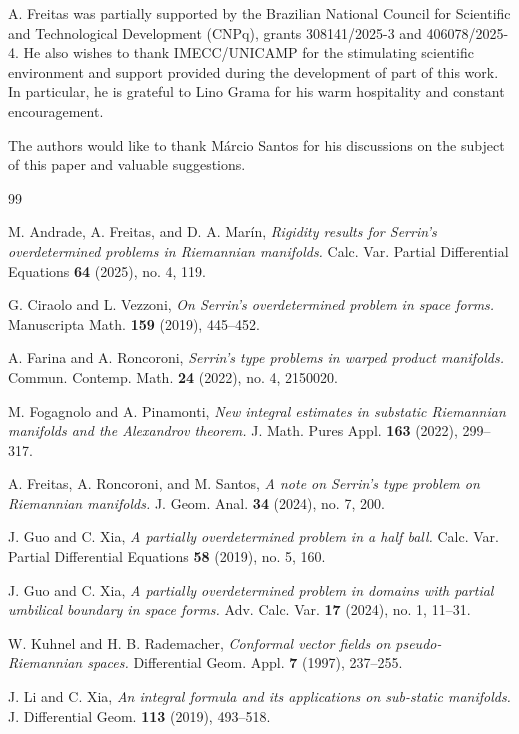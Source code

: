 \documentclass[reqno,11pt]{amsart}
\numberwithin{equation}{section}  %
\begin{document}
A. Freitas was partially supported by the Brazilian National Council for Scientific and Technological Development (CNPq), grants 308141/2025-3 and 406078/2025-4. He also wishes to thank IMECC/UNICAMP for the stimulating scientific environment and support provided during the development of part of this work. In particular, he is grateful to Lino Grama for his warm hospitality and constant encouragement.

The authors would like to thank Márcio Santos for his discussions on the subject of this paper and valuable suggestions.
%
%
\begin{thebibliography}{99}

M. Andrade, A. Freitas, and D. A. Mar\'in,
\emph{Rigidity results for Serrin's overdetermined problems in Riemannian manifolds.}
Calc. Var. Partial Differential Equations {\bf 64} (2025), no. 4, 119.

G. Ciraolo and L. Vezzoni,
\emph{On Serrin’s overdetermined problem in space forms.}
Manuscripta Math. {\bf 159} (2019), 445--452.

A. Farina and A. Roncoroni,
\emph{Serrin's type problems in warped product manifolds.}
Commun. Contemp. Math. {\bf 24} (2022), no. 4, 2150020.

M. Fogagnolo and A. Pinamonti,
\emph{New integral estimates in substatic Riemannian manifolds and the Alexandrov theorem.}
J. Math. Pures Appl. {\bf 163} (2022), 299--317.

A. Freitas, A. Roncoroni, and M. Santos,
\emph{A note on Serrin's type problem on Riemannian manifolds.}
J. Geom. Anal. {\bf 34} (2024), no. 7, 200.

J. Guo and C. Xia,
\emph{A partially overdetermined problem in a half ball.}
Calc. Var. Partial Differential Equations {\bf 58} (2019), no. 5, 160.

J. Guo and C. Xia,
\emph{A partially overdetermined problem in domains with partial umbilical boundary in space forms.}
Adv. Calc. Var. {\bf 17} (2024), no. 1, 11--31.

W. Kuhnel and H. B. Rademacher,
\emph{Conformal vector fields on pseudo-Riemannian spaces.}
Differential Geom. Appl. {\bf 7} (1997), 237--255.

J. Li and C. Xia,
\emph{An integral formula and its applications on sub-static manifolds.}
J. Differential Geom. {\bf 113} (2019), 493--518.


\end{thebibliography}
\end{document}
